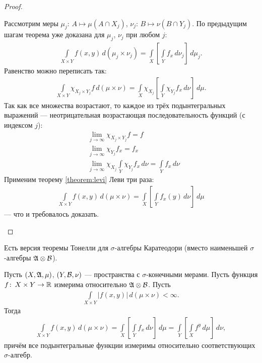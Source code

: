 \begin{proof}
\begin{enumerate}
 Рассмотрим меры $\mu_j \colon\, A \mapsto \mu(A \cap X_j)$, $\nu_j \colon\, B \mapsto \nu(B \cap Y_j)$. По предыдущим шагам теорема уже доказана для $\mu_j$, $\nu_j$ при любом $j$:
 \begin{align*}
  \int\limits_{X \times Y} f(x,y) \, d(\mu_j \times \nu_j) = \int\limits_{X} \left[ \int\limits_{Y} f_x \, d\nu_j   \right] \, d\mu_j
 .\end{align*} Равенство можно переписать так:
 \begin{align*}
  \int\limits_{X \times Y} \chi_{X_j \times Y_j} f \, d(\mu \times \nu) = \int\limits_{X} \chi_{X_j} \left[ \int\limits_{Y} \chi_{Y_j} f_x \, d\nu   \right] \, d\mu  
 .\end{align*} Так как все множества возрастают, то каждое из трёх подынтегральных выражений  --- неотрицательная возрастающая последовательность функций (с индексом $j$):
 \begin{align*}
  &\lim_{j \to \infty} \chi_{X_j \times Y_j} f = f \\
  &\lim_{j \to \infty} \chi_{Y_j} f_x = f_x \\
  &\lim_{j \to \infty} \chi_{X_j} \int\limits_{Y} \chi_{Y_j} f_x \, d\nu = \int\limits_{Y} f_x \, d\nu  
 \end{align*} Применим теорему \ref{theorem:levi} Леви три раза: \begin{align*}
 \int\limits_{X \times Y} f(x,y) \, d(\mu \times \nu)  = \int\limits_{X} \left[ \int\limits_{Y} f_x(y) \, d\nu   \right] \, d\mu  
\end{align*} --- что и требовалось доказать.

   \label{enum4:theorem:tonelli}
 \end{enumerate}
\end{proof}
\begin{remrk*}
 Есть версия теоремы Тонелли для $\sigma$-алгебры Каратеодори (вместо наименьшей $\sigma$-алгебры $\mathfrak{A} \otimes \mathcal{B}$).
\end{remrk*}
\begin{thm}[%
Фубини]
\label{theorem:fubini}

Пусть $(X, \mathfrak{A}, \mu)$, $(Y, \mathcal{B}, \nu)$  --- пространства с $\sigma$-конечными мерами. Пусть функция $f \colon\, X \times Y \to \mathbb{R}  $ измерима относительно $\mathfrak{A} \otimes \mathcal{B}$. Пусть \begin{align}
 \label{equation:theorem:fubini}
 \int\limits_{X \times Y} \left| f(x, y) \right| \, d(\mu \times \nu) < \infty
.\end{align} Тогда \begin{align*}
 \int\limits_{X \times Y} f(x,y) \, d(\mu \times \nu)  = \int\limits_{X} \left[ \int\limits_{Y} f_x \, d\nu   \right] \, d\mu    = \int\limits_{Y} \left[ \int\limits_{X} f^{y} \, d\mu   \right] \, d\nu  ,
\end{align*} причём все подынтегральные функции измеримы относительно соответствующих $\sigma$-алгебр.
\end{thm}
